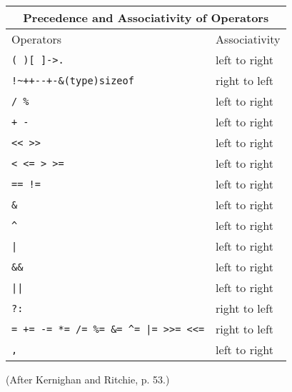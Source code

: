 



\begin{tabular}{l|l}
\multicolumn{2}{c}{\sc Precedence and Associativity of Operators} \\ \hline\hline
{\sc Operators}                                & {\sc Associativity} \\ \hline
{\tt ( )\hfil [ ]\hfil ->\hfil .}            & left to right \\
{\tt !\hfil \~\hfil ++\hfil -\relax-\hfil +\hfil -\hfil *\hfil \&\hfil ({\rm type})\hfil sizeof} & right to left \\ 
{\tt * \hfil / \hfil \% \hfil }                & left to right \\ \hline
{\tt + \hfil - \hfil }                         & left to right \\
{\tt << \hfil >> \hfil }                       & left to right \\
{\tt < \hfil <= \hfil > \hfil >=\hfil }        & left to right \\ \hline
{\tt == \hfil != \hfil }                       & left to right \\
{\tt \& }                                      & left to right \\
{\tt \verb+^+}                                       & left to right \\ \hline
{\tt |}                                        & left to right \\
{\tt \&\&}                                     & left to right \\
{\tt ||}                                       & left to right \\ \hline
{\tt ?:}                                       & right to left \\
{\tt = += -= *= /= \%= \&= \verb+^+= |= >>= <<=}     & right to left \\
{\tt ,}                                        & left to right \\ \hline
\end{tabular}

(After Kernighan and Ritchie, p. 53.)



